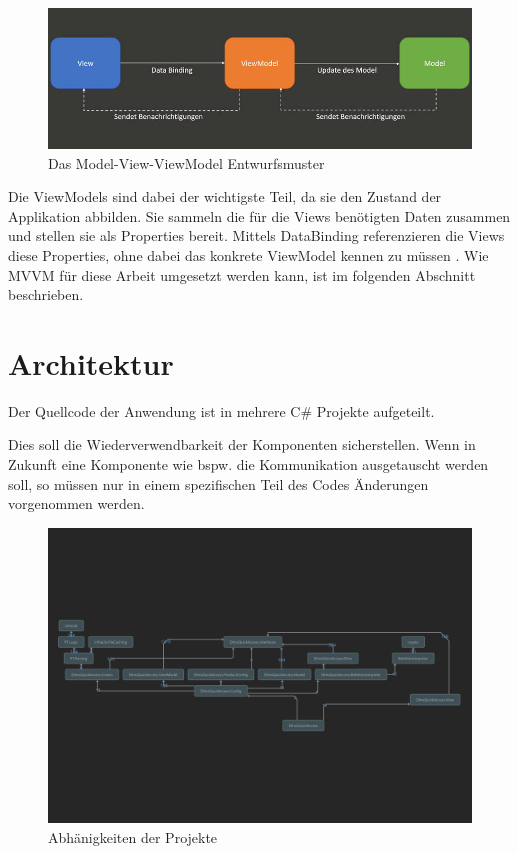 \begin{figure}[H]
   \centering
   \includegraphics[width=1.0\textwidth]{gfx/mvvm.jpg}
   \caption{
      Das Model-View-ViewModel Entwurfsmuster
   }
   \label{fig:mvvm}
\end{figure}
Die ViewModels sind dabei der wichtigste Teil, da sie den Zustand der Applikation abbilden.
Sie sammeln die für die Views benötigten Daten zusammen und stellen sie als Properties bereit.
Mittels DataBinding referenzieren die Views diese Properties, ohne dabei das konkrete ViewModel kennen zu müssen \parencite{vermeir2022desktop}.
Wie \ac{MVVM} für diese Arbeit umgesetzt werden kann, ist im folgenden Abschnitt beschrieben.




\section{Architektur}
Der Quellcode der Anwendung ist in mehrere C\# Projekte aufgeteilt.

Dies soll die Wiederverwendbarkeit der Komponenten sicherstellen.
Wenn in Zukunft eine Komponente wie bspw. die Kommunikation ausgetauscht werden soll, so müssen nur in einem spezifischen Teil des Codes Änderungen vorgenommen werden.

\begin{figure}[H]
   \centering
   \includegraphics[width=1.0\textwidth]{gfx/Architecture view for DlmsQuickAccess.png}
   \caption{
      Abhänigkeiten der Projekte
   }
   \label{fig:projectDependencies}
\end{figure}


